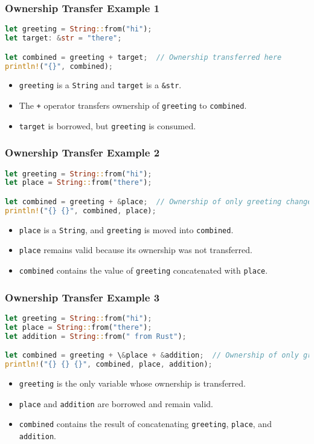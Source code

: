 \documentclass[aspectratio=169, table]{beamer}
\begin{document}
\begin{frame}[fragile]
\frametitle{Ownership Transfer Example 1}
\begin{lstlisting}[language=Rust]
let greeting = String::from("hi"); 
let target: &str = "there";

let combined = greeting + target;  // Ownership transferred here
println!("{}", combined);
\end{lstlisting}
\begin{itemize}
\item \texttt{greeting} is a \texttt{String} and \texttt{target} is a \texttt{\&str}.
\item The \texttt{+} operator transfers ownership of \texttt{greeting} to \texttt{combined}.
\item \texttt{target} is borrowed, but \texttt{greeting} is consumed.
\end{itemize}
\end{frame}

\begin{frame}[fragile]
\frametitle{Ownership Transfer Example 2}
\begin{lstlisting}[language=Rust]
let greeting = String::from("hi"); 
let place = String::from("there");

let combined = greeting + &place;  // Ownership of only greeting changed
println!("{} {}", combined, place); 
\end{lstlisting}
\begin{itemize}
\item \texttt{place} is a \texttt{String}, and \texttt{greeting} is moved into \texttt{combined}.
\item \texttt{place} remains valid because its ownership was not transferred.
\item \texttt{combined} contains the value of \texttt{greeting} concatenated with \texttt{place}.
\end{itemize}
\end{frame}

\begin{frame}[fragile]
\frametitle{Ownership Transfer Example 3}
\begin{lstlisting}[language=Rust]
let greeting = String::from("hi"); 
let place = String::from("there");
let addition = String::from(" from Rust");

let combined = greeting + \&place + &addition;  // Ownership of only greeting changed
println!("{} {} {}", combined, place, addition); 
\end{lstlisting}
\begin{itemize}
\item \texttt{greeting} is the only variable whose ownership is transferred.
\item \texttt{place} and \texttt{addition} are borrowed and remain valid.
\item \texttt{combined} contains the result of concatenating \texttt{greeting}, \texttt{place}, and \texttt{addition}.
\end{itemize}
\end{frame}
\end{document}

